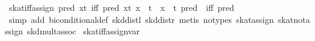 \begin{isabellebody}
\ skat{}iff{}assign{}\ {}pred\ {}{}{}x{}t{}{}\ iff\ pred\ {}{}{}x{}t{}{}{}\ x\ {}{}\ t\ {}\ x\ {}{}\ t{}\ pred\ {}\ iff\ pred\ {}{}\isanewline
%
\isadelimproof
\ \ %
\endisadelimproof
%
\isatagproof
{}\isamarkupfalse%
\ {}simp\ add{}\ biconditional{}def\ skd{}distl\ skd{}distr{}\ {}metis\ {}no{}types{}\ skat{}assign{}\ skat{}not{}assign\ skd{}mult{}assoc{}%
\endisatagproof
{\isafoldproof}%
%
\isadelimproof
\isanewline
%
\endisadelimproof
\isanewline
{}\isamarkupfalse%
\ skat{}iff{}assign{}var{}\isanewline

\end{isabellebody}
